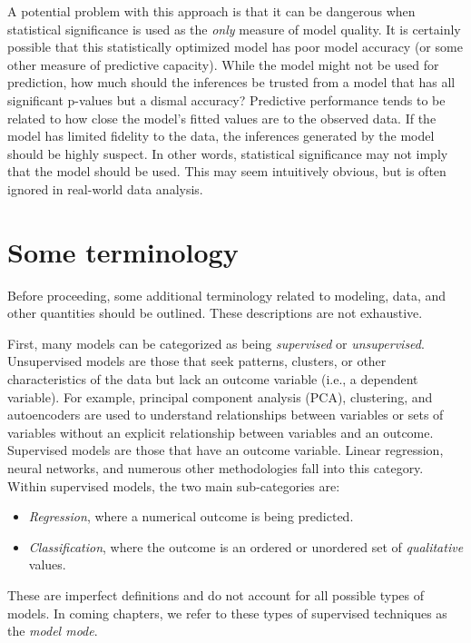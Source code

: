 \documentclass[11pt]{book}
\begin{document}
A potential problem with this approach is that it can be dangerous when statistical significance is used as the \emph{only} measure of model quality. It is certainly possible that this statistically optimized model has poor model accuracy (or some other measure of predictive capacity). While the model might not be used for prediction, how much should the inferences be trusted from a model that has all significant p-values but a dismal accuracy? Predictive performance tends to be related to how close the model's fitted values are to the observed data. If the model has limited fidelity to the data, the inferences generated by the model should be highly suspect. In other words, statistical significance may not imply that the model should be used. This may seem intuitively obvious, but is often ignored in real-world data analysis.

\hypertarget{some-terminology}{%
\section{Some terminology}\label{some-terminology}}

Before proceeding, some additional terminology related to modeling, data, and other quantities should be outlined. These descriptions are not exhaustive.

First, many models can be categorized as being \emph{supervised} or \emph{unsupervised}. Unsupervised models are those that seek patterns, clusters, or other characteristics of the data but lack an outcome variable (i.e., a dependent variable). For example, principal component analysis (PCA), clustering, and autoencoders are used to understand relationships between variables or sets of variables without an explicit relationship between variables and an outcome. Supervised models are those that have an outcome variable. Linear regression, neural networks, and numerous other methodologies fall into this category. Within supervised models, the two main sub-categories are:

\begin{itemize}
\item
  \emph{Regression}, where a numerical outcome is being predicted.
\item
  \emph{Classification}, where the outcome is an ordered or unordered set of \emph{qualitative} values.
\end{itemize}

These are imperfect definitions and do not account for all possible types of models. In coming chapters, we refer to these types of supervised techniques as the \emph{model mode}.
\end{document}
